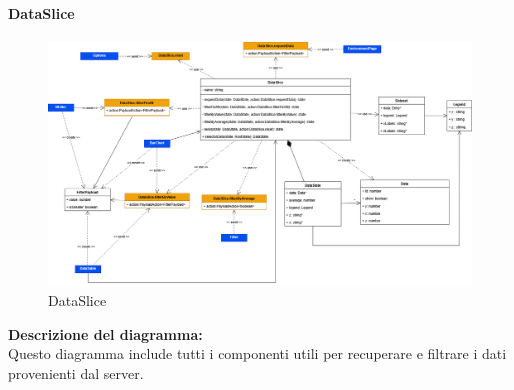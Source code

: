 \paragraph{DataSlice}
\begin{figure}[h!] \centering
      \includegraphics[scale=0.3]{template/images/uml_front/logic/DataSlice.png}
      \caption{DataSlice}
\end{figure}
\textbf{Descrizione del diagramma:}\\
Questo diagramma include tutti i componenti utili per recuperare e filtrare i dati provenienti dal server.
